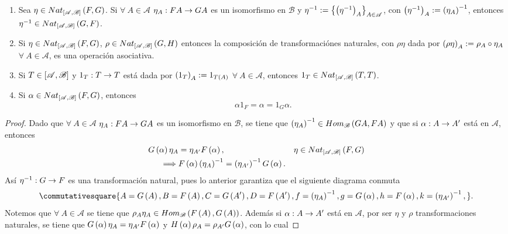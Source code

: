 \documentclass{article}
\begin{document}
\begin{enumerate}[label=\textbf{Ej \arabic*.}]
\begin{enumerate}
			\item Sea $\eta\in Nat_{\left[\mathscr{A},\mathscr{B}\right]}\left(F,G\right)$. Si $\forall\ A\in\mathscr{A}$ $\catarrow{\eta_{A}}{FA}{GA}{}$ es un isomorfismo en $\mathscr{B}$ y $\eta^{-1}:=\left\{\left(\eta^{-1}\right)_A\right\}_{A\in\mathscr{A}}$, con $\left(\eta^{-1}\right)_A:=\left(\eta_{A}\right)^{-1}$, entonces $\eta^{-1}\in Nat_{\left[\mathscr{A},\mathscr{B}\right]}\left(G,F\right)$.
			\item Si $\eta\in Nat_{\left[\mathscr{A},\mathscr{B}\right]}\left(F,G\right)$, $\rho\in Nat_{\left[\mathscr{A},\mathscr{B}\right]}\left(G,H\right)$ entonces la composición de transformaciónes naturales, con $\rho\eta$ dada por $\left(\rho\eta\right)_A:=\rho_A\circ\eta_A$ $\forall\ A\in\mathscr{A}$, es una operación asociativa.
			\item Si $T\in\left[\mathscr{A},\mathscr{B}\right]$ y $\catarrow{1_T}{T}{T}{}$ está dada por $\left(1_T\right)_A:=1_{T\left(A\right)}$ $\forall\ A\in\mathscr{A}$, entonces $1_T\in Nat_{\left[\mathscr{A},\mathscr{B}\right]}\left(T,T\right)$.
			\item Si $\alpha\in Nat_{\left[\mathscr{A},\mathscr{B}\right]}\left(F,G\right)$, entonces
			\begin{equation*}
				\alpha 1_F=\alpha=1_G \alpha.
			\end{equation*}
		\end{enumerate}
		\begin{proof}
			 Dado que $\forall\ A\in\mathscr{A}$ $\catarrow{\eta_{A}}{FA}{GA}{}$ es un isomorfismo en $\mathscr{B}$, se tiene que $\left(\eta_{A}\right)^{-1}\in Hom_{\mathscr{B}}\left(GA,FA\right)$ y que si $\catarrow{\alpha}{A}{A'}{}$ está en $\mathscr{A}$, entonces
			\begin{align*}
				G\left(\alpha\right)\eta_{A}&=\eta_{A'}F\left(\alpha\right), && \eta\in Nat_{\left[\mathscr{A},\mathscr{B}\right]}\left(F,G\right)\\
				\implies& F\left(\alpha\right)\left(\eta_{A}\right)^{-1}=\left(\eta_{A'}\right)^{-1}G\left(\alpha\right).
			\end{align*} 
		 Así $\catarrow{\eta^{-1}}{G}{F}{}$ es una transformación natural, pues lo anterior garantiza que el siguiente diagrama conmuta
		 \begin{equation*}
		 	\commutativesquare{A=G\lrprth{A},B=F\lrprth{A},C=G\lrprth{A'},D=F\lrprth{A'},f=\lrprth{\eta_{A}}^{-1},g=G\lrprth{\alpha},h=F\lrprth{\alpha},k=\lrprth{\eta_{A'}}^{-1},}.
		 \end{equation*}
	 	 Notemos que $\forall\ A\in\mathscr{A}$ se tiene que $\rho_A\eta_{A}\in Hom_{\mathscr{B}}\left(F\left(A\right),G\left(A\right)\right)$. Además si $\catarrow{\alpha}{A}{A'}{}$ está en $\mathscr{A}$, por ser $\eta$ y $\rho$ transformaciones naturales, se tiene que $G\left(\alpha\right)\eta_{A}=\eta_{A'}F\left(\alpha\right)$ y $H\left(\alpha\right)\rho_{A}=\rho_{A'}G\left(\alpha\right)$, con lo cual

\end{proof}
\end{enumerate}
\end{document}

